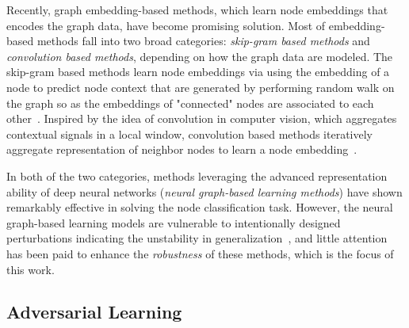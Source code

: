 \documentclass[10pt,journal,compsoc]{IEEEtran}
\begin{document}
Recently, graph embedding-based methods, which learn node embeddings that encodes the graph data, have become promising solution. Most of embedding-based methods fall into two broad categories: \textit{skip-gram based methods} and \textit{convolution based methods}, depending on how the graph data are modeled. The skip-gram based methods learn node embeddings via using the embedding of a node to predict node context that are generated by performing random walk on the graph so as the embeddings of "connected" nodes are associated to each other~\cite{perozzi2014deepwalk,tang2015line,grover2016node2vec,yang2016revisiting}. Inspired by the idea of convolution in computer vision, which aggregates contextual signals in a local window, convolution based methods iteratively aggregate representation of neighbor nodes to learn a node embedding~\cite{bruna2013spectral,duvenaud2015convolutional,defferrard2016convolutional,hamilton2017inductive,kipf2017semi,ying2018hierarchical,velickovic2018graph,ying2018graph,zhang2018deep,Wang2019NGCF}.

In both of the two categories, methods leveraging the advanced representation ability of deep neural networks (\textit{neural graph-based learning methods}) have shown remarkably effective in solving the node classification task. However, the neural graph-based learning models are vulnerable to intentionally designed perturbations indicating the unstability in generalization~\cite{dai2018adversarial,zugner2018adversarial}, and little attention has been paid to enhance the \textit{robustness} of these methods, which is the focus of this work.
\subsection{Adversarial Learning}
\end{document}
